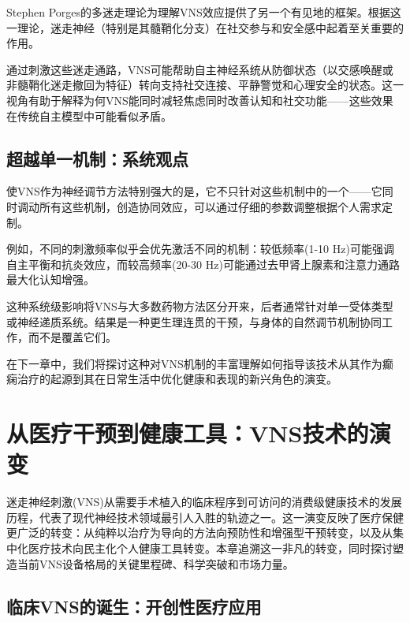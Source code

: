 \documentclass[
  Letterpaper,
]{scrbook}
\begin{document}
Stephen
Porges的多迷走理论为理解VNS效应提供了另一个有见地的框架。根据这一理论，迷走神经（特别是其髓鞘化分支）在社交参与和安全感中起着至关重要的作用。

通过刺激这些迷走通路，VNS可能帮助自主神经系统从防御状态（以交感唤醒或非髓鞘化迷走撤回为特征）转向支持社交连接、平静警觉和心理安全的状态。这一视角有助于解释为何VNS能同时减轻焦虑同时改善认知和社交功能------这些效果在传统自主模型中可能看似矛盾。

\section{超越单一机制：系统观点}\label{ux8d85ux8d8aux5355ux4e00ux673aux5236ux7cfbux7edfux89c2ux70b9}

使VNS作为神经调节方法特别强大的是，它不只针对这些机制中的一个------它同时调动所有这些机制，创造协同效应，可以通过仔细的参数调整根据个人需求定制。

例如，不同的刺激频率似乎会优先激活不同的机制：较低频率(1-10
Hz)可能强调自主平衡和抗炎效应，而较高频率(20-30
Hz)可能通过去甲肾上腺素和注意力通路最大化认知增强。

这种系统级影响将VNS与大多数药物方法区分开来，后者通常针对单一受体类型或神经递质系统。结果是一种更生理连贯的干预，与身体的自然调节机制协同工作，而不是覆盖它们。

在下一章中，我们将探讨这种对VNS机制的丰富理解如何指导该技术从其作为癫痫治疗的起源到其在日常生活中优化健康和表现的新兴角色的演变。


\chapter{从医疗干预到健康工具：VNS技术的演变}\label{ux4eceux533bux7597ux5e72ux9884ux5230ux5065ux5eb7ux5de5ux5177vnsux6280ux672fux7684ux6f14ux53d8}

迷走神经刺激(VNS)从需要手术植入的临床程序到可访问的消费级健康技术的发展历程，代表了现代神经技术领域最引人入胜的轨迹之一。这一演变反映了医疗保健更广泛的转变：从纯粹以治疗为导向的方法向预防性和增强型干预转变，以及从集中化医疗技术向民主化个人健康工具转变。本章追溯这一非凡的转变，同时探讨塑造当前VNS设备格局的关键里程碑、科学突破和市场力量。

\section{临床VNS的诞生：开创性医疗应用}\label{ux4e34ux5e8avnsux7684ux8bdeux751fux5f00ux521bux6027ux533bux7597ux5e94ux7528}
\end{document}
